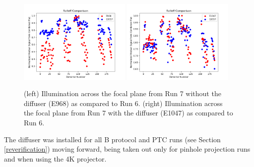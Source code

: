 \begin{figure}[htbp]
\centering
\includegraphics[width=0.48\textwidth]{figures/Run7_Illumination.png}
\includegraphics[width=0.48\textwidth]{figures/Run7_DiffuserIllumination.png}
\caption{(left) Illumination across the focal plane from Run 7 without the diffuser (E968) as compared to Run 6. (right) Illumination across the focal plane from Run 7 with the diffuser (E1047) as compared to Run 6.}
\label{fig:roll-off}
\end{figure}



The diffuser was installed for all B protocol and PTC runs (see Section \ref{reverification}) moving
forward, being taken out only for pinhole projection runs and when using the
4K projector.


